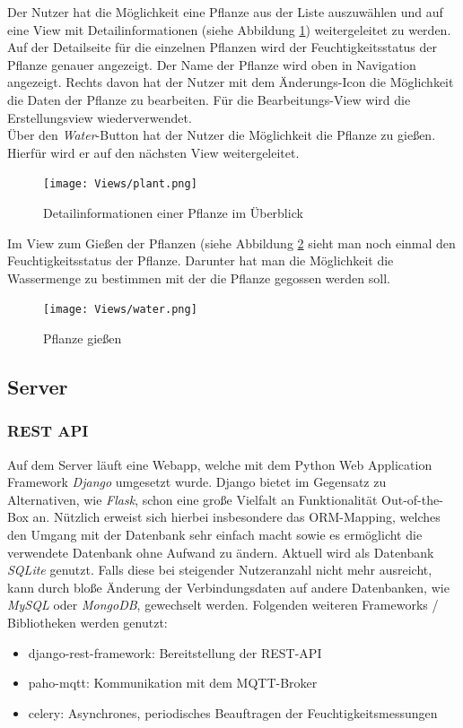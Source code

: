 Der Nutzer hat die Möglichkeit eine Pflanze aus der Liste auszuwählen und auf eine View mit Detailinformationen (siehe Abbildung \ref{plant}) weitergeleitet zu werden. Auf der Detailseite für die einzelnen Pflanzen wird der Feuchtigkeitsstatus der Pflanze genauer angezeigt. Der Name der Pflanze wird oben in Navigation angezeigt. Rechts davon hat der Nutzer mit dem Änderungs-Icon die Möglichkeit die Daten der Pflanze zu bearbeiten. Für die Bearbeitungs-View wird die Erstellungsview wiederverwendet.\\

Über den \textit{Water}-Button hat der Nutzer die Möglichkeit die Pflanze zu gießen. Hierfür wird er auf den nächsten View weitergeleitet. 

\begin{figure}[H]
    \centering
    \texttt{[image: Views/plant.png]}
    \caption{Detailinformationen einer Pflanze im Überblick}
    \label{plant}
\end{figure}

Im View zum Gießen der Pflanzen (siehe Abbildung \ref{water} sieht man noch einmal den Feuchtigkeitsstatus der Pflanze. Darunter hat man die Möglichkeit die Wassermenge zu bestimmen mit der die Pflanze gegossen werden soll. 
\begin{figure}[H]
    \centering
    \texttt{[image: Views/water.png]}
    \caption{Pflanze gießen}
    \label{water}
\end{figure}

    \subsection{Server}

        \subsubsection{REST API}
        Auf dem Server läuft eine Webapp, welche mit dem Python Web Application Framework \textit{Django} umgesetzt wurde. Django bietet im Gegensatz zu Alternativen, wie \textit{Flask}, schon eine große Vielfalt an Funktionalität Out-of-the-Box an. Nützlich erweist sich hierbei insbesondere das ORM-Mapping, welches den Umgang mit der Datenbank sehr einfach macht sowie es ermöglicht die verwendete Datenbank ohne Aufwand zu ändern. Aktuell wird als Datenbank \textit{SQLite} genutzt. Falls diese bei steigender Nutzeranzahl nicht mehr ausreicht, kann durch bloße Änderung der Verbindungsdaten auf andere Datenbanken, wie \textit{MySQL} oder \textit{MongoDB}, gewechselt werden.
        Folgenden weiteren Frameworks / Bibliotheken werden genutzt:
        \begin{itemize}
            \item django-rest-framework: Bereitstellung der REST-API
            \item paho-mqtt: Kommunikation mit dem MQTT-Broker
            \item celery: Asynchrones, periodisches Beauftragen der Feuchtigkeitsmessungen
        \end{itemize}
    
